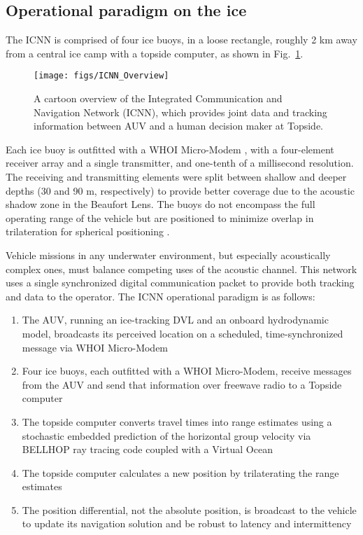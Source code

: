 \subsection{Operational paradigm on the ice}

The ICNN is comprised of four ice buoys, in a loose rectangle, roughly 2 km away from a central ice camp with a topside computer, as shown in Fig.~\ref{fig:icnnOverview}.

\begin{figure}[h!]
	\centering
	\texttt{[image: figs/ICNN\_Overview]}
	\caption{A cartoon overview of the Integrated Communication and Navigation Network (ICNN), which provides joint data and tracking information between AUV and a human decision maker at Topside.}
	\label{fig:icnnOverview}
\end{figure}

Each ice buoy is outfitted with a WHOI Micro-Modem \citep{singh_underwater_2006}, with a four-element receiver array and a single transmitter, and one-tenth of a millisecond resolution.
The receiving and transmitting elements were split between shallow and deeper depths (30 and 90 m, respectively) to provide better coverage due to the acoustic shadow zone in the Beaufort Lens.
The buoys do not encompass the full operating range of the vehicle but are positioned to minimize overlap in trilateration for spherical positioning \citep{deffenbaugh_relationship_1996}.

Vehicle missions in any underwater environment, but especially acoustically complex ones, must balance competing uses of the acoustic channel.
This network uses a single synchronized digital communication packet to provide both tracking and data to the operator.
The ICNN operational paradigm is as follows:
\begin{enumerate}
\item The AUV, running an ice-tracking DVL and an onboard hydrodynamic model, broadcasts its perceived location on a scheduled, time-synchronized message via WHOI Micro-Modem
\item Four ice buoys, each outfitted with a WHOI Micro-Modem, receive messages from the AUV and send that information over freewave radio to a Topside computer
\item The topside computer converts travel times into range estimates using a stochastic embedded prediction of the horizontal group velocity via BELLHOP ray tracing code \citep{porter_bellhop_2011} coupled with a Virtual Ocean \citep{schneider_netsim_2018}
\item The topside computer calculates a new position by trilaterating the range estimates
\item The position differential, not the absolute position, is broadcast to the vehicle to update its navigation solution and be robust to latency and intermittency
\end{enumerate}

